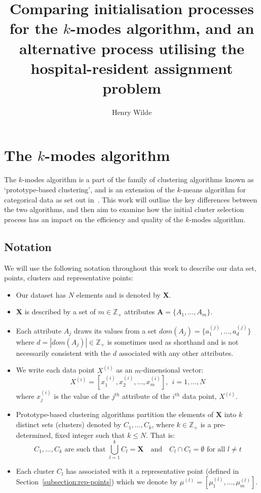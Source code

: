 \documentclass{article}
\title{Comparing initialisation processes for the \(k\)-modes algorithm, and an 
	alternative process utilising the hospital-resident assignment problem}
\author{Henry Wilde}
\theoremstyle{definition}
\begin{document}
\maketitle


\section{The \(k\)-modes algorithm}\label{section:kmodes}

The \(k\)-modes algorithm is a part of the family of clustering algorithms known 
as `prototype-based clustering', and is an extension of the \(k\)-means 
algorithm for categorical data as set out in~\cite{Huang98}. This work will 
outline the key differences between the two algorithms, and then aim to 
examine how the initial cluster selection process has an impact on the 
efficiency and quality of the \(k\)-modes algorithm.\\


\subsection{Notation}\label{subsection:notation}

We will use the following notation throughout this work to describe our data 
set, points, clusters and representative points:

\begin{itemize}
    \item Our dataset has \(N\) elements and is denoted by \textbf{X}.
    \item \textbf{X} is described by a set of \(m \in \mathbb{Z}_+\) attributes 
        \(\textbf{A} = \{A_1, \ldots, A_m\}\).
    \item Each attribute \(A_j\) draws its values from a set \(dom(A_j) = 
        \{a_1^{(j)}, \ldots, a_d^{(j)}\}\) where \(d = |dom(A_j)| \in 
        \mathbb{Z}_+\) is sometimes used as shorthand and is not necessarily 
        consistent with the \(d\) associated with any other attributes.
    \item We write each data point \(X^{(i)}\) as an \(m\)-dimensional vector:
	\[
		X^{(i)} = [x_1^{(i)}, x_2^{(i)}, \ldots, x_m^{(i)}], \ \ i=1, \ldots, N
	\]
        where \(x_j^{(i)}\) is the value of the \(j^{th}\) attribute of the
        \(i^{th}\) data point, \(X^{(i)}\).
	\item Prototype-based clustering algorithms partition the elements of 
        \(\textbf{X}\) into \(k\) distinct sets (clusters) denoted by \(C_1, 
        \ldots, C_k\), where \(k \in \mathbb{Z}_+\) is a pre-determined, fixed 
        integer such that \(k \le N\). That is:
	\[
		C_1, \ldots, C_k \text{ are such that } \bigcup_{l=1}^k C_l = 
		\textbf{X} \quad \text{and} \quad C_l \cap C_t = \emptyset 
		\text{ for all } l \ne t
	\]
    \item Each cluster \(C_l\) has associated with it a representative point 
		(defined in Section~\ref{subsection:rep-points}) which we denote by 
        \(\mu^{(l)} = [\mu_1^{(l)}, \ldots, \mu_m^{(l)}]\).
\end{itemize}
\end{document}
